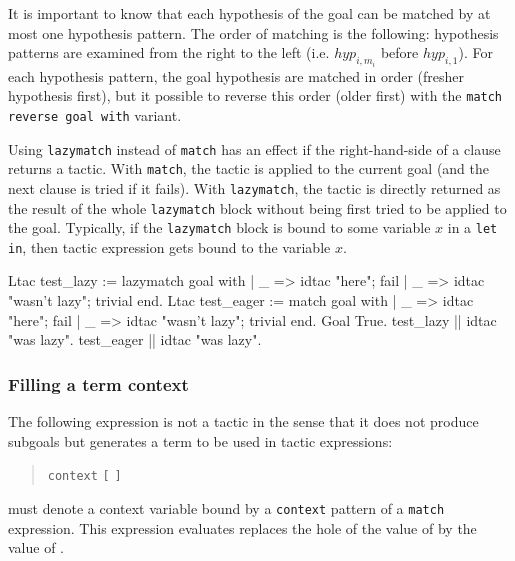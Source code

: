 \medskip

It is important to know that each hypothesis of the goal can be
matched by at most one hypothesis pattern. The order of matching is
the following: hypothesis patterns are examined from the right to the
left (i.e. $hyp_{i,m_i}$ before $hyp_{i,1}$). For each hypothesis
pattern, the goal hypothesis are matched in order (fresher hypothesis
first), but it possible to reverse this order (older first) with
the {\tt match reverse goal with} variant.

\variant
{}
Using {\tt lazymatch} instead of {\tt match} has an effect if the
right-hand-side of a clause returns a tactic. With {\tt match}, the
tactic is applied to the current goal (and the next clause is tried if
it fails). With {\tt lazymatch}, the tactic is directly returned as
the result of the whole {\tt lazymatch} block without being first
tried to be applied to the goal. Typically, if the {\tt lazymatch}
block is bound to some variable $x$ in a {\tt let in}, then tactic
expression gets bound to the variable $x$.

\begin{coq_example}
Ltac test_lazy :=
  lazymatch goal with
  | _ => idtac "here"; fail 
  | _ => idtac "wasn't lazy"; trivial
  end.
Ltac test_eager :=
  match goal with
  | _ => idtac "here"; fail 
  | _ => idtac "wasn't lazy"; trivial
  end.
Goal True.
test_lazy || idtac "was lazy".
test_eager || idtac "was lazy".
\end{coq_example}

\subsubsection[Filling a term context]{Filling a term context}

The following expression is not a tactic in the sense that it does not
produce subgoals but generates a term to be used in tactic
expressions:
\begin{quote}
{\tt context} {\ident} {\tt [} {\tacexpr} {\tt ]}
\end{quote}
{\ident} must denote a context variable bound by a {\tt context}
pattern of a {\tt match} expression. This expression evaluates
replaces the hole of the value of {\ident} by the value of
{\tacexpr}.

\ErrMsg {}


